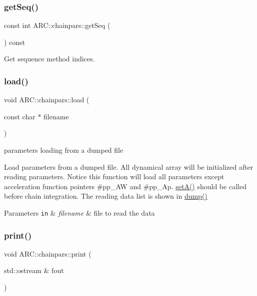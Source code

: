 \subsubsection{\texorpdfstring{get\+Seq()}{getSeq()}}
{\footnotesize\ttfamily const int A\+R\+C\+::chainpars\+::get\+Seq (\begin{DoxyParamCaption}{ }\end{DoxyParamCaption}) const\hspace{0.3cm}{\ttfamily [inline]}}



Get sequence method indices. 

\hypertarget{classARC_1_1chainpars_aa42cf56363fba1701a26cc445eda01d5}{}\label{classARC_1_1chainpars_aa42cf56363fba1701a26cc445eda01d5} 
\subsubsection{\texorpdfstring{load()}{load()}}
{\footnotesize\ttfamily void A\+R\+C\+::chainpars\+::load (\begin{DoxyParamCaption}\item[{const char $\ast$}]{filename }\end{DoxyParamCaption})\hspace{0.3cm}{\ttfamily [inline]}}



parameters loading from a dumped file 

Load parameters from a dumped file. All dynamical array will be initialized after reading parameters. Notice this function will load all parameters except acceleration function pointers \#pp\+\_\+\+AW and \#pp\+\_\+\+Ap. \hyperlink{classARC_1_1chainpars_ad77ec5334198faaf5957ab6d02aa9b39}{set\+A()} should be called before chain integration. The reading data list is shown in \hyperlink{classARC_1_1chainpars_a926438a652307d24bd8a03b0ca926382}{dump()} 
\begin{DoxyParams}[1]{Parameters}
\mbox{\tt in}  & {\em filename} & file to read the data \\
\hline
\end{DoxyParams}
\hypertarget{classARC_1_1chainpars_a3bd667353d49614c52ad6c965a7480f3}{}\label{classARC_1_1chainpars_a3bd667353d49614c52ad6c965a7480f3} 
\subsubsection{\texorpdfstring{print()}{print()}}
{\footnotesize\ttfamily void A\+R\+C\+::chainpars\+::print (\begin{DoxyParamCaption}\item[{std\+::ostream \&}]{fout }\end{DoxyParamCaption})\hspace{0.3cm}{\ttfamily [inline]}}



